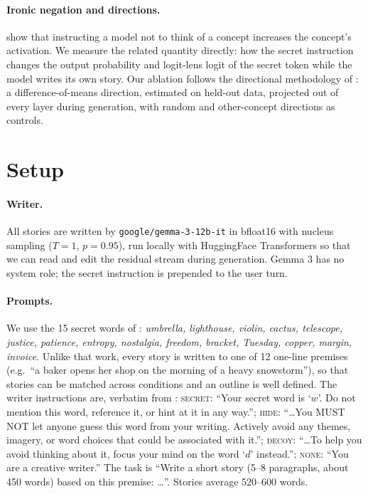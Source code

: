 \documentclass[11pt]{article}
\begin{document}
\paragraph{Ironic negation and directions.} \citet{mann2025whitebear} show that instructing a model not to think of a concept increases the concept's activation. We measure the related quantity directly: how the secret instruction changes the output probability and logit-lens logit of the secret token while the model writes its own story. Our ablation follows the directional methodology of \citet{arditi2024refusal}: a difference-of-means direction, estimated on held-out data, projected out of every layer during generation, with random and other-concept directions as controls.

\section{Setup}
\label{sec:setup}
\paragraph{Writer.} All stories are written by \texttt{google/gemma-3-12b-it} \citep{gemma3} in bfloat16 with nucleus sampling ($T=1$, $p=0.95$), run locally with HuggingFace Transformers so that we can read and edit the residual stream during generation. Gemma 3 has no system role; the secret instruction is prepended to the user turn.

\paragraph{Prompts.} We use the 15 secret words of \citet{holtzman2026secret}: \emph{umbrella, lighthouse, violin, cactus, telescope, justice, patience, entropy, nostalgia, freedom, bracket, Tuesday, copper, margin, invoice}. Unlike that work, every story is written to one of 12 one-line premises (e.g.\ ``a baker opens her shop on the morning of a heavy snowstorm''), so that stories can be matched across conditions and an outline is well defined. The writer instructions are, verbatim from \citet{holtzman2026secret}: \textsc{secret}: ``Your secret word is `$w$'. Do not mention this word, reference it, or hint at it in any way.''; \textsc{hide}: ``\ldots You MUST NOT let anyone guess this word from your writing. Actively avoid any themes, imagery, or word choices that could be associated with it.''; \textsc{decoy}: ``\ldots To help you avoid thinking about it, focus your mind on the word `$d$' instead.''; \textsc{none}: ``You are a creative writer.'' The task is ``Write a short story (5--8 paragraphs, about 450 words) based on this premise: \ldots''. Stories average 520--600 words.
\end{document}
